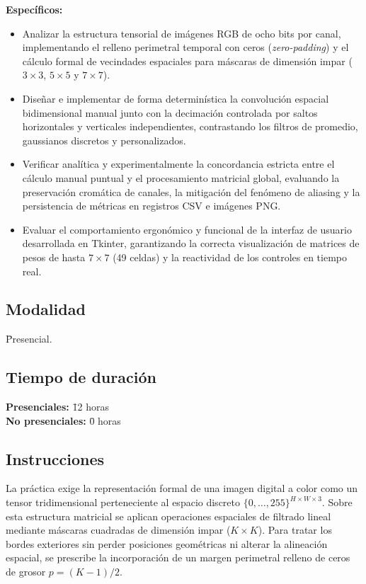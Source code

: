 \documentclass[11pt]{article}
\begin{document}
\textbf{Específicos:}\\
\begin{itemize}[itemsep=0.2em]
\item Analizar la estructura tensorial de imágenes RGB de ocho bits por canal, implementando el relleno perimetral temporal con ceros (\textit{zero-padding}) y el cálculo formal de vecindades espaciales para máscaras de dimensión impar ($3\times3$, $5\times5$ y $7\times7$).
\item Diseñar e implementar de forma determinística la convolución espacial bidimensional manual junto con la decimación controlada por saltos horizontales y verticales independientes, contrastando los filtros de promedio, gaussianos discretos y personalizados.
\item Verificar analítica y experimentalmente la concordancia estricta entre el cálculo manual puntual y el procesamiento matricial global, evaluando la preservación cromática de canales, la mitigación del fenómeno de aliasing y la persistencia de métricas en registros CSV e imágenes PNG.
\item Evaluar el comportamiento ergonómico y funcional de la interfaz de usuario desarrollada en Tkinter, garantizando la correcta visualización de matrices de pesos de hasta $7\times7$ (49 celdas) y la reactividad de los controles en tiempo real.
\end{itemize}

\subsection{Modalidad}
\begin{tabbing}
    \hspace{1cm} \= Presencial.
\end{tabbing}

\subsection{Tiempo de duración}
\begin{tabbing}
    \hspace{1cm} \= \textbf{Presenciales:} \= 12 horas \\
    \hspace{1cm} \= \textbf{No presenciales:} \= 0 horas
\end{tabbing}

\subsection{Instrucciones}
La práctica exige la representación formal de una imagen digital a color como un tensor tridimensional perteneciente al espacio discreto $\{0,\ldots,255\}^{H\times W\times 3}$. Sobre esta estructura matricial se aplican operaciones espaciales de filtrado lineal mediante máscaras cuadradas de dimensión impar ($K\times K$). Para tratar los bordes exteriores sin perder posiciones geométricas ni alterar la alineación espacial, se prescribe la incorporación de un margen perimetral relleno de ceros de grosor $p=(K-1)/2$.
\end{document}
